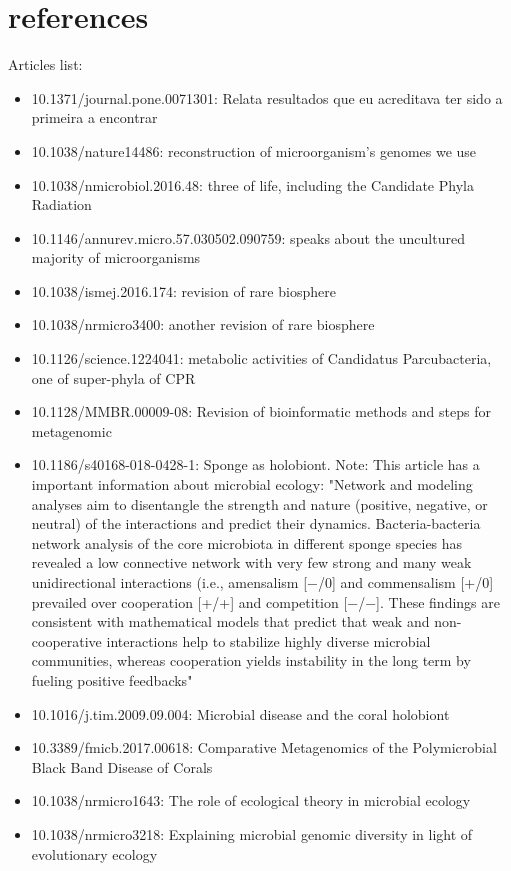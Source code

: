 \documentclass[12pt, a4paper]{report}
\begin{document}
\chapter{references}
Articles list:
\begin{itemize}
\item 10.1371/journal.pone.0071301: Relata resultados que eu acreditava ter sido a primeira a encontrar
\item 10.1038/nature14486: reconstruction of microorganism's genomes we use
\item 10.1038/nmicrobiol.2016.48: three of life, including the Candidate Phyla Radiation
\item 10.1146/annurev.micro.57.030502.090759: speaks about the uncultured majority of microorganisms
\item  10.1038/ismej.2016.174: revision of rare biosphere
\item 10.1038/nrmicro3400: another revision of rare biosphere
\item 10.1126/science.1224041: metabolic activities of Candidatus Parcubacteria, one of super-phyla of CPR
\item 10.1128/MMBR.00009-08: Revision of bioinformatic methods and steps for metagenomic
\item 10.1186/s40168-018-0428-1: Sponge as holobiont. Note: This article has a important information about microbial ecology: 
"Network and modeling analyses aim to disentangle the strength and nature (positive, negative, or neutral) of the interactions and predict their dynamics. Bacteria-bacteria network analysis of the core microbiota in different sponge species has revealed a low connective network with very few strong and many weak unidirectional interactions (i.e., amensalism [−/0] and commensalism [+/0] prevailed over cooperation [+/+] and competition [−/−]. These findings are consistent with mathematical models that predict that weak and non-cooperative interactions help to stabilize highly diverse microbial communities, whereas cooperation yields instability in the long term by fueling positive feedbacks"
\item 10.1016/j.tim.2009.09.004: Microbial disease and the coral holobiont
\item 10.3389/fmicb.2017.00618: Comparative Metagenomics of the Polymicrobial Black Band Disease of Corals
\item 10.1038/nrmicro1643: The role of ecological theory in microbial ecology
\item 10.1038/nrmicro3218: Explaining microbial genomic diversity in light of evolutionary ecology

\end{itemize}
\end{document}
